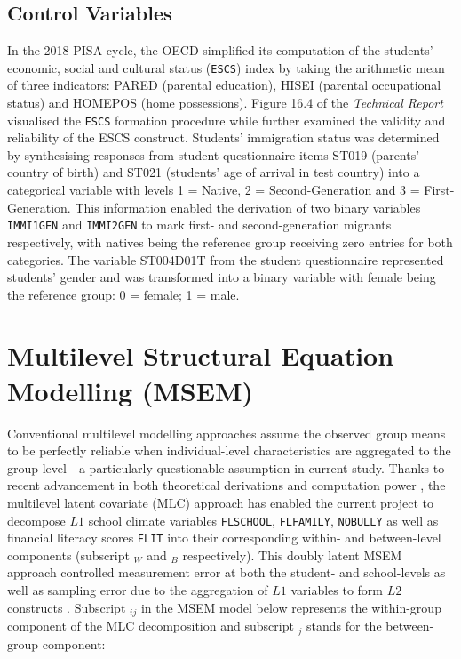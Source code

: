 \subsection{Control Variables}

In the 2018 PISA cycle, the OECD simplified its computation of the students' economic, social and cultural status (\texttt{ESCS}) index by taking the arithmetic mean of three indicators: \textsf{PARED} (parental education), \textsf{HISEI} (parental occupational status) and \textsf{HOMEPOS} (home possessions). Figure 16.4 of the \textit{Technical Report} \parencite{PISAtech} visualised the \texttt{ESCS} formation procedure while \textcite{avvisati:2020} further examined the validity and reliability of the ESCS construct. Students' immigration status was determined by synthesising responses from student questionnaire items \textsf{ST019} (parents' country of birth) and \textsf{ST021} (students' age of arrival in test country) \parencite[][pp. 212--213]{PISAvol3} into a categorical variable with levels \textsf{1 = Native}, \textsf{2 = Second-Generation} and \textsf{3 = First-Generation}. This information enabled the derivation of two binary variables \texttt{IMMI1GEN} and \texttt{IMMI2GEN} to mark first- and second-generation migrants respectively, with natives being the reference group receiving zero entries for both categories. The variable \textsf{ST004D01T} from the student questionnaire \parencite{FLdata} represented students' gender and was transformed into a binary variable with female being the reference group: \textsf{0 = female}; \textsf{1 = male}.

\section{Multilevel Structural Equation Modelling (MSEM)}

Conventional multilevel modelling approaches assume the observed group means to be perfectly reliable when individual-level characteristics are aggregated to the group-level---a particularly questionable assumption in current study. Thanks to recent advancement in both theoretical derivations \parencite{ludtke:2008, marsh:2009} and computation power \parencite{mplus}, the multilevel latent covariate (MLC) approach has enabled the current project to decompose $L1$ school climate variables \texttt{FLSCHOOL}, \texttt{FLFAMILY}, \texttt{NOBULLY} as well as financial literacy scores \texttt{FLIT} into their corresponding within- and between-level components (subscript $_W$ and $_B$ respectively). This doubly latent MSEM approach controlled measurement error at both the student- and school-levels as well as sampling error due to the aggregation of $L1$ variables to form $L2$ constructs \parencite{ludtke:2009, ludtke:2011, marsh:2012}. Subscript $_{ij}$ in the MSEM model below represents the within-group component of the MLC decomposition and subscript $_j$ stands for the between-group component:


